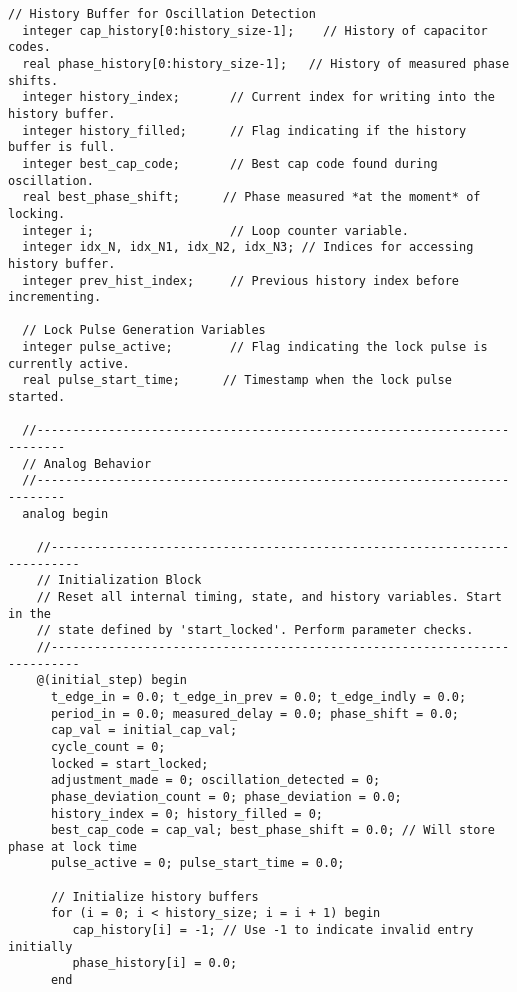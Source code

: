 \begin{lstlisting}[caption={Verilog-A Generic Capacitor Tuner Implementation}]
  // History Buffer for Oscillation Detection
  integer cap_history[0:history_size-1];    // History of capacitor codes.
  real phase_history[0:history_size-1];   // History of measured phase shifts.
  integer history_index;       // Current index for writing into the history buffer.
  integer history_filled;      // Flag indicating if the history buffer is full.
  integer best_cap_code;       // Best cap code found during oscillation.
  real best_phase_shift;      // Phase measured *at the moment* of locking.
  integer i;                   // Loop counter variable.
  integer idx_N, idx_N1, idx_N2, idx_N3; // Indices for accessing history buffer.
  integer prev_hist_index;     // Previous history index before incrementing.

  // Lock Pulse Generation Variables
  integer pulse_active;        // Flag indicating the lock pulse is currently active.
  real pulse_start_time;      // Timestamp when the lock pulse started.

  //--------------------------------------------------------------------------
  // Analog Behavior
  //--------------------------------------------------------------------------
  analog begin

    //--------------------------------------------------------------------------
    // Initialization Block
    // Reset all internal timing, state, and history variables. Start in the
    // state defined by 'start_locked'. Perform parameter checks.
    //--------------------------------------------------------------------------
    @(initial_step) begin
      t_edge_in = 0.0; t_edge_in_prev = 0.0; t_edge_indly = 0.0;
      period_in = 0.0; measured_delay = 0.0; phase_shift = 0.0;
      cap_val = initial_cap_val;
      cycle_count = 0;
      locked = start_locked;
      adjustment_made = 0; oscillation_detected = 0;
      phase_deviation_count = 0; phase_deviation = 0.0;
      history_index = 0; history_filled = 0;
      best_cap_code = cap_val; best_phase_shift = 0.0; // Will store phase at lock time
      pulse_active = 0; pulse_start_time = 0.0;

      // Initialize history buffers
      for (i = 0; i < history_size; i = i + 1) begin
         cap_history[i] = -1; // Use -1 to indicate invalid entry initially
         phase_history[i] = 0.0;
      end


\end{lstlisting}
